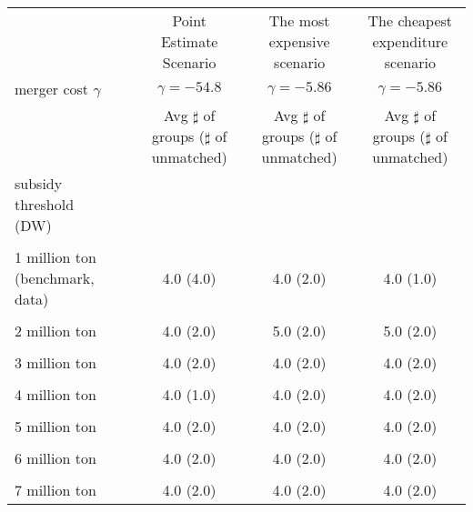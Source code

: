 \begin{tabular}{@{\extracolsep{5pt}}lcccc}
\toprule 
 &  & Point Estimate Scenario & The most expensive scenario & The cheapest expenditure scenario \\
merger cost $\gamma$ &  & $\gamma=-54.8$ & $\gamma=-5.86$ & $\gamma=-5.86$ \\
 &  & Avg $\sharp$ of groups ($\sharp$ of unmatched) & Avg $\sharp$ of groups ($\sharp$ of unmatched) & Avg $\sharp$ of groups ($\sharp$ of unmatched) \\
\midrule 
subsidy threshold (DW) &  &  &  &  \\
 &  &  &  &  \\
1 million ton (benchmark, data) &  & 4.0 (4.0) & 4.0 (2.0) & 4.0 (1.0) \\
 &  &  &  &  \\
2 million ton &  & 4.0 (2.0) & 5.0 (2.0) & 5.0 (2.0) \\
 &  &  &  &  \\
3 million ton &  & 4.0 (2.0) & 4.0 (2.0) & 4.0 (2.0) \\
 &  &  &  &  \\
4 million ton &  & 4.0 (1.0) & 4.0 (2.0) & 4.0 (2.0) \\
 &  &  &  &  \\
5 million ton &  & 4.0 (2.0) & 4.0 (2.0) & 4.0 (2.0) \\
 &  &  &  &  \\
6 million ton &  & 4.0 (2.0) & 4.0 (2.0) & 4.0 (2.0) \\
 &  &  &  &  \\
7 million ton &  & 4.0 (2.0) & 4.0 (2.0) & 4.0 (2.0) \\
\hline 
\bottomrule 
\end{tabular}
